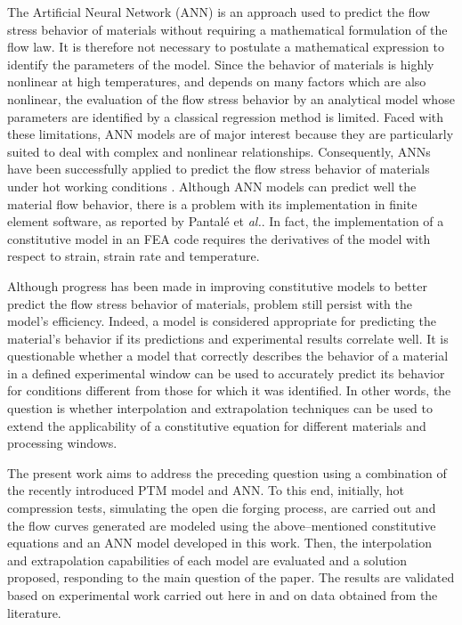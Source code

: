 \documentclass[twoside,english,1p,final,sort&compress]{elsarticle}
\makeatletter
\theoremstyle{plain}
\DeclareRobustCommand{\eal}{et \emph{al.}\@\xspace}
\makeatother
\begin{document}
The Artificial Neural Network (ANN) is an approach used to predict the flow stress behavior of materials without requiring a mathematical formulation of the flow law. It is therefore not necessary to postulate a mathematical expression to identify the parameters of the model. Since the behavior of materials is highly nonlinear at high temperatures, and depends on many factors which are also nonlinear, the evaluation of the flow stress behavior by an analytical model whose parameters are identified by a classical regression method is limited. Faced with these limitations, ANN models are of major interest because they are particularly suited to deal with complex and nonlinear relationships. Consequently, ANNs have been successfully applied to predict the flow stress behavior of materials under hot working conditions \cite{Lin-2008-ANN, Lu-2011-ANN, Ashtiani-2016-CSP, Stoffel-2019-NNB}. Although ANN models can predict well the material flow behavior, there is a problem with its implementation in finite element software, as reported by Pantalé \eal \cite{Pantale-2021}. In fact, the implementation of a constitutive model in an FEA code requires the derivatives of the model with respect to strain, strain rate and temperature.

Although progress has been made in improving constitutive models to better predict the flow stress behavior of materials, problem still persist with the model's efficiency. Indeed, a model is considered appropriate for predicting the material's behavior if its predictions and experimental results correlate well. It is questionable whether a model that correctly describes the behavior of a material in a defined experimental window can be used to accurately predict its behavior for conditions different from those for which it was identified. In other words, the question is whether interpolation and extrapolation techniques can be used to extend the applicability of a constitutive equation for different materials and processing windows.

The present work aims to address the preceding question using a combination of the recently introduced PTM model and ANN. To this end, initially, hot compression tests, simulating the open die forging process, are carried out and the flow curves  generated are modeled using the above--mentioned constitutive equations and an ANN model developed in this work. Then, the interpolation and extrapolation capabilities of each model are evaluated and a solution proposed, responding to the main question of the paper. The results are validated based on experimental work carried out here in and on data obtained from the literature. 
\end{document}
